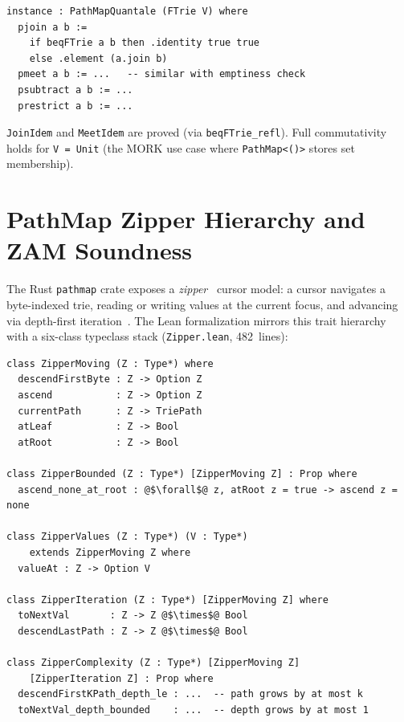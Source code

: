\documentclass[11pt]{article}
\theoremstyle{definition}
\theoremstyle{remark}
\newcommand{\MORK}{\textup{MORK}}
\begin{document}
\begin{lstlisting}[caption={\texttt{PathMapQuantale} instance for \texttt{FTrie}.}]
instance : PathMapQuantale (FTrie V) where
  pjoin a b :=
    if beqFTrie a b then .identity true true
    else .element (a.join b)
  pmeet a b := ...   -- similar with emptiness check
  psubtract a b := ...
  prestrict a b := ...
\end{lstlisting}

\noindent
\texttt{JoinIdem} and \texttt{MeetIdem} are proved (via
\texttt{beqFTrie\_refl}).
Full commutativity holds for \texttt{V = Unit} (the \MORK{} use case where
\texttt{PathMap<()>} stores set membership).

\section{PathMap Zipper Hierarchy and ZAM Soundness}
\label{sec:zipper}

The Rust \texttt{pathmap} crate exposes a \emph{zipper}~\cite{Huet1997}
cursor model:
a cursor navigates a byte-indexed trie, reading or writing values at the
current focus, and advancing via depth-first
iteration~\cite{McBride2001}.
The Lean formalization mirrors this trait hierarchy with a six-class
typeclass stack (\texttt{Zipper.lean}, 482~lines):

\begin{lstlisting}[caption={Zipper typeclass hierarchy (excerpt).}]
class ZipperMoving (Z : Type*) where
  descendFirstByte : Z -> Option Z
  ascend           : Z -> Option Z
  currentPath      : Z -> TriePath
  atLeaf           : Z -> Bool
  atRoot           : Z -> Bool

class ZipperBounded (Z : Type*) [ZipperMoving Z] : Prop where
  ascend_none_at_root : @$\forall$@ z, atRoot z = true -> ascend z = none

class ZipperValues (Z : Type*) (V : Type*)
    extends ZipperMoving Z where
  valueAt : Z -> Option V

class ZipperIteration (Z : Type*) [ZipperMoving Z] where
  toNextVal       : Z -> Z @$\times$@ Bool
  descendLastPath : Z -> Z @$\times$@ Bool

class ZipperComplexity (Z : Type*) [ZipperMoving Z]
    [ZipperIteration Z] : Prop where
  descendFirstKPath_depth_le : ...  -- path grows by at most k
  toNextVal_depth_bounded    : ...  -- depth grows by at most 1
\end{lstlisting}
\end{document}
